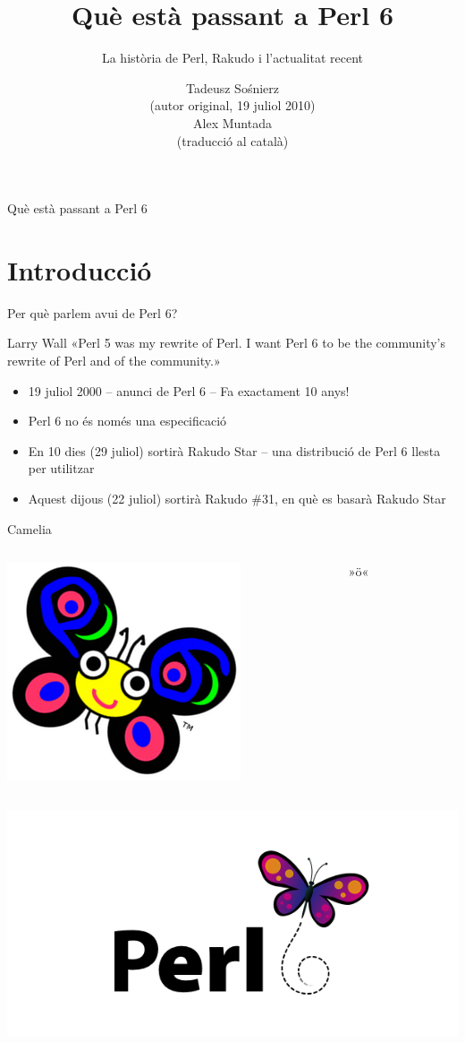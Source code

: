 \documentclass{beamer}
\title{Què està passant a Perl 6}
\subtitle{La història de Perl, Rakudo i l'actualitat recent}
\author{Tadeusz Sośnierz\\
{\scriptsize(autor original, 19 juliol 2010)}\\
Alex Muntada\\
{\scriptsize(traducció al català)}}
\begin{document}
\begin{frame}{Què està passant a Perl 6}
	\titlepage
\end{frame}

			\section{Introducció}

\begin{frame}{Per què parlem avui de Perl 6?}
	\begin{block}{Larry Wall}
		«Perl 5 was my rewrite of Perl. I want Perl 6 to be
		the community's rewrite of Perl
		and of the community.»
	\end{block}
	\pause
	\begin{itemize}
		\item 19 juliol 2000 -- anunci de Perl 6
			-- Fa exactament 10 anys!
		\pause
		\item Perl 6 no és només una especificació
		\pause
		\item En 10 dies (29 juliol) sortirà Rakudo Star
			-- una distribució de Perl 6 llesta per utilitzar
		\pause
		\item Aquest dijous (22 juliol) sortirà Rakudo \#31,
			en què es basarà Rakudo Star
	\end{itemize}
\end{frame}

\begin{frame}{Camelia}
	\begin{columns}
		\begin{column}{0.5\textwidth}
			\includegraphics[scale=0.54]{camelia}
		\end{column}
		\begin{column}{0.5\textwidth}
			{\Huge »ö«}
		\end{column}
	\end{columns}
	\includegraphics[scale=0.38]{newlogo}
\end{frame}
\end{document}
